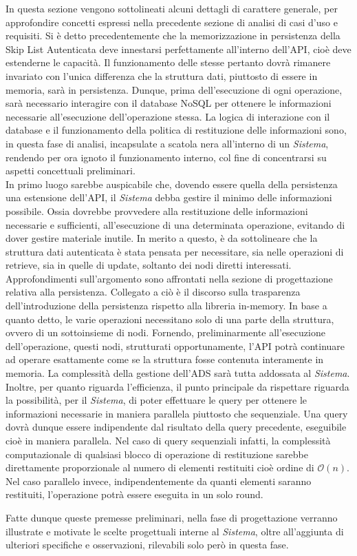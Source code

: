 	In questa sezione vengono sottolineati alcuni dettagli di carattere generale, per approfondire concetti espressi nella precedente sezione di analisi di casi d'uso e requisiti.
	Si è detto precedentemente che la memorizzazione in persistenza della Skip List Autenticata deve innestarsi perfettamente all'interno dell'API, cioè deve estenderne le capacità. Il funzionamento delle stesse pertanto dovrà rimanere invariato con l'unica differenza che la struttura dati, piuttosto di essere in memoria, sarà in persistenza. Dunque, prima dell'esecuzione di ogni operazione, sarà necessario interagire con il database NoSQL per ottenere le informazioni necessarie all'esecuzione dell'operazione stessa. La logica di interazione con il database e il funzionamento della politica di restituzione delle informazioni sono, in questa fase di analisi, incapsulate a scatola nera all'interno di un \textit{Sistema}, rendendo per ora ignoto il funzionamento interno, col fine di concentrarsi su aspetti concettuali preliminari. \\
	In primo luogo sarebbe auspicabile che, dovendo essere quella della persistenza una estensione dell'API, il \textit{Sistema} debba gestire il minimo delle informazioni possibile. Ossia dovrebbe provvedere alla restituzione delle informazioni necessarie e sufficienti, all'esecuzione di una determinata operazione, evitando di dover gestire materiale inutile. In merito a questo, è da sottolineare che la struttura dati autenticata è stata pensata per necessitare, sia nelle operazioni di retrieve, sia in quelle di update, soltanto dei nodi diretti interessati. Approfondimenti sull'argomento sono affrontati nella sezione di progettazione relativa alla persistenza.
	Collegato a ciò è il discorso sulla trasparenza dell'introduzione della persistenza rispetto alla libreria in-memory. In base a quanto detto, le varie operazioni necessitano solo di una parte della struttura, ovvero di un sottoinsieme di nodi. Fornendo, preliminarmente all'esecuzione dell'operazione, questi nodi, strutturati opportunamente, l'API potrà continuare ad operare esattamente come se la struttura fosse contenuta interamente in memoria. La complessità della gestione dell'ADS sarà tutta addossata al \textit{Sistema}.
	Inoltre, per quanto riguarda l'efficienza, il punto principale da rispettare riguarda la possibilità, per il \textit{Sistema}, di poter effettuare le query per ottenere le informazioni necessarie in maniera parallela piuttosto che sequenziale. Una query dovrà dunque essere indipendente dal risultato della query precedente, eseguibile cioè in maniera parallela. Nel caso di query sequenziali infatti, la complessità computazionale di qualsiasi blocco di operazione di restituzione sarebbe direttamente proporzionale al numero di elementi restituiti cioè ordine di $\mathcal{O}(n)$. Nel caso parallelo invece, indipendentemente da quanti elementi saranno restituiti, l'operazione potrà essere eseguita in un solo round.
	
	Fatte dunque queste premesse preliminari, nella fase di progettazione verranno illustrate e motivate le scelte progettuali interne al \textit{Sistema}, oltre all'aggiunta di ulteriori specifiche e osservazioni, rilevabili solo però in questa fase.
	
